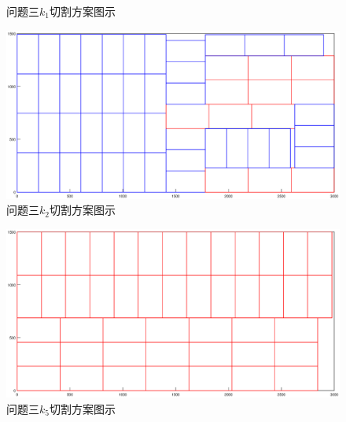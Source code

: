 \documentclass[hyperref,UTF8]{article}
\begin{document}
{\begin{figure}[htbp]
  \caption{问题三$k_1$切割方案图示 }\label{qiegex1}
\end{figure}
\begin{figure}[htbp]
  \centering
  \includegraphics[width=\textwidth]{picture/P_2_44_12}
  \caption{问题三$k_2$切割方案图示 }\label{qiegex2}
\end{figure}
\begin{figure}[htbp]
  \centering
  \includegraphics[width=\textwidth]{picture/P_1_3}
  \caption{问题三$k_5$切割方案图示 }\label{qiegex3}
\end{figure}
}
\end{document}
